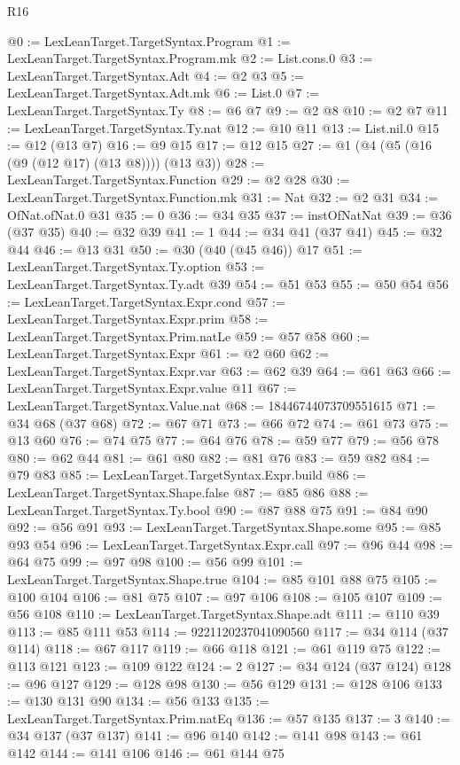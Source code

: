 \begin{lexlean}{R16}
\begin{coremodule}
@0 := LexLeanTarget.TargetSyntax.Program
@1 := LexLeanTarget.TargetSyntax.Program.mk
@2 := List.cons.{0}
@3 := LexLeanTarget.TargetSyntax.Adt
@4 := @2 @3
@5 := LexLeanTarget.TargetSyntax.Adt.mk
@6 := List.{0}
@7 := LexLeanTarget.TargetSyntax.Ty
@8 := @6 @7
@9 := @2 @8
@10 := @2 @7
@11 := LexLeanTarget.TargetSyntax.Ty.nat
@12 := @10 @11
@13 := List.nil.{0}
@15 := @12 (@13 @7)
@16 := @9 @15
@17 := @12 @15
@27 := @1 (@4 (@5 (@16 (@9 (@12 @17) (@13 @8)))) (@13 @3))
@28 := LexLeanTarget.TargetSyntax.Function
@29 := @2 @28
@30 := LexLeanTarget.TargetSyntax.Function.mk
@31 := Nat
@32 := @2 @31
@34 := OfNat.ofNat.{0} @31
@35 := 0
@36 := @34 @35
@37 := instOfNatNat
@39 := @36 (@37 @35)
@40 := @32 @39
@41 := 1
@44 := @34 @41 (@37 @41)
@45 := @32 @44
@46 := @13 @31
@50 := @30 (@40 (@45 @46)) @17
@51 := LexLeanTarget.TargetSyntax.Ty.option
@53 := LexLeanTarget.TargetSyntax.Ty.adt @39
@54 := @51 @53
@55 := @50 @54
@56 := LexLeanTarget.TargetSyntax.Expr.cond
@57 := LexLeanTarget.TargetSyntax.Expr.prim
@58 := LexLeanTarget.TargetSyntax.Prim.natLe
@59 := @57 @58
@60 := LexLeanTarget.TargetSyntax.Expr
@61 := @2 @60
@62 := LexLeanTarget.TargetSyntax.Expr.var
@63 := @62 @39
@64 := @61 @63
@66 := LexLeanTarget.TargetSyntax.Expr.value @11
@67 := LexLeanTarget.TargetSyntax.Value.nat
@68 := 18446744073709551615
@71 := @34 @68 (@37 @68)
@72 := @67 @71
@73 := @66 @72
@74 := @61 @73
@75 := @13 @60
@76 := @74 @75
@77 := @64 @76
@78 := @59 @77
@79 := @56 @78
@80 := @62 @44
@81 := @61 @80
@82 := @81 @76
@83 := @59 @82
@84 := @79 @83
@85 := LexLeanTarget.TargetSyntax.Expr.build
@86 := LexLeanTarget.TargetSyntax.Shape.false
@87 := @85 @86
@88 := LexLeanTarget.TargetSyntax.Ty.bool
@90 := @87 @88 @75
@91 := @84 @90
@92 := @56 @91
@93 := LexLeanTarget.TargetSyntax.Shape.some
@95 := @85 @93 @54
@96 := LexLeanTarget.TargetSyntax.Expr.call
@97 := @96 @44
@98 := @64 @75
@99 := @97 @98
@100 := @56 @99
@101 := LexLeanTarget.TargetSyntax.Shape.true
@104 := @85 @101 @88 @75
@105 := @100 @104
@106 := @81 @75
@107 := @97 @106
@108 := @105 @107
@109 := @56 @108
@110 := LexLeanTarget.TargetSyntax.Shape.adt
@111 := @110 @39
@113 := @85 @111 @53
@114 := 9221120237041090560
@117 := @34 @114 (@37 @114)
@118 := @67 @117
@119 := @66 @118
@121 := @61 @119 @75
@122 := @113 @121
@123 := @109 @122
@124 := 2
@127 := @34 @124 (@37 @124)
@128 := @96 @127
@129 := @128 @98
@130 := @56 @129
@131 := @128 @106
@133 := @130 @131 @90
@134 := @56 @133
@135 := LexLeanTarget.TargetSyntax.Prim.natEq
@136 := @57 @135
@137 := 3
@140 := @34 @137 (@37 @137)
@141 := @96 @140
@142 := @141 @98
@143 := @61 @142
@144 := @141 @106
@146 := @61 @144 @75

\end{coremodule}
\end{lexlean}
